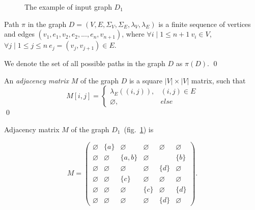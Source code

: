 \begin{figure}[h]
    \centering        
    \caption{The example of input graph $D_1$}
    \label{fig:example_input_graph}
\end{figure}

\begin{definition}
Path $\pi$ in the graph $D=(V, E, \Sigma_V, \Sigma_E, \lambda_V, \lambda_E)$ is a finite sequence of vertices and edges $(v_1, e_1, v_2, e_2, ..., e_n, v_{n+1})$, where $\forall i \mid 1 \leq n+1 ~ v_i \in V$, $\forall j \mid 1 \leq j \leq n ~ e_j=(v_j, v_{j+1}) \in E$.

We denote the set of all possible paths in the graph $D$ as $\pi(D)$. \qed 
\end{definition}

\begin{definition}
An \emph{adjacency matrix} $M$ of the graph $D$ is a square $|V|\times|V|$ matrix, such that 
\begin{equation*}
M[i,j] =
 \begin{cases}
   \lambda_E((i, j)), & (i, j) \in E\\
   \varnothing, & else
 \end{cases}
\end{equation*} \qed
\end{definition}

Adjacency matrix $M$ of the graph $D_1$~(fig.~\ref{fig:example_input_graph}) is

$$
    M =
    \begin{pmatrix}
    \varnothing     & \{a\} &   \varnothing      &   \varnothing   &   \varnothing   &   \varnothing   \\
    \varnothing     &   \varnothing   & \{a, b\} &   \varnothing   &       & \{b\} \\
    \varnothing     &   \varnothing   &   \varnothing      &   \varnothing   & \{d\} &   \varnothing   \\
    \varnothing     &   \varnothing   & \{c\}    &   \varnothing   &   \varnothing   &   \varnothing   \\
    \varnothing     &   \varnothing   &   \varnothing      & \{c\} &   \varnothing   & \{d\} \\
    \varnothing     & \varnothing     &   \varnothing      &   \varnothing   & \{d\} &   \varnothing
    \end{pmatrix}.
$$


